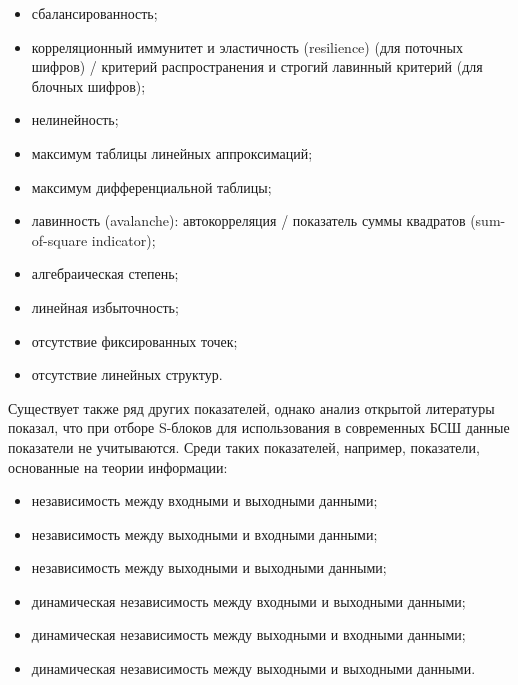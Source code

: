 \begin{itemize}

    \item сбалансированность;

    \item корреляционный иммунитет и эластичность (resilience) (для поточных
    шифров) / критерий распространения и строгий лавинный критерий (для блочных
    шифров);

    \item нелинейность;

    \item максимум таблицы линейных аппроксимаций;

    \item максимум дифференциальной таблицы;

    \item лавинность (avalanche): автокорреляция / показатель суммы квадратов
    (sum-of-square indicator);

    \item алгебраическая степень;

    \item линейная избыточность;

    \item отсутствие фиксированных точек;
    
    \item отсутствие линейных структур.

\end{itemize}

Существует также ряд других показателей, однако анализ открытой литературы
показал, что при отборе S-блоков для использования в современных БСШ данные
показатели не учитываются. Среди таких показателей, например, показатели,
основанные на теории информации: 

\begin{itemize}

    \item независимость между входными и выходными данными;

    \item независимость между выходными и входными данными;

    \item независимость между выходными и выходными данными;

    \item динамическая независимость между входными и выходными данными;

    \item динамическая независимость между выходными и входными данными;

    \item динамическая независимость между выходными и выходными данными.

\end{itemize}

